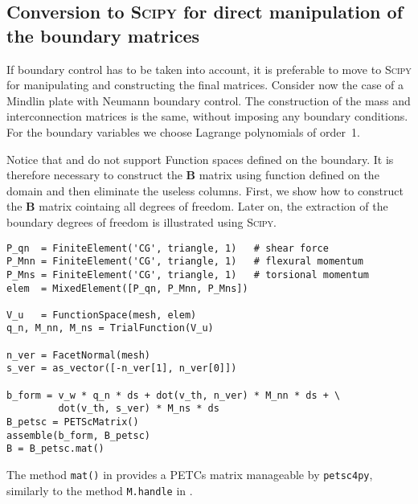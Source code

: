 \subsection*{Conversion to \textsc{Scipy} for direct manipulation of the boundary matrices}
If boundary control has to be taken into account, it is preferable to move to \textsc{Scipy} for manipulating and constructing the final matrices. Consider now the case of a Mindlin plate with Neumann boundary control. The construction of the mass and interconnection matrices is the same, without imposing any boundary conditions. For the boundary variables we choose Lagrange polynomials of order~1. 

\begin{remark}\label{rmk:Bmatrix}
Notice that \fenics and \firedrake do not support Function spaces defined on the boundary. It is therefore necessary to construct the $\mathbf{B}$ matrix using function defined on the domain and then eliminate the useless columns. First, we show how to construct the $\mathbf{B}$ matrix cointaing all degrees of freedom. Later on, the extraction of the boundary degrees of freedom is illustrated using \textsc{Scipy}. 
\end{remark}

\begin{tcolorbox}[title = Control matrix construction in  \fenics, coltitle=black, breakable, size=fbox, boxrule=1pt, pad at break*=1mm, colframe=red, enlarge top by=0.25em, enlarge bottom by=0.5em]
\begin{Verbatim}[tabsize=4]
P_qn  = FiniteElement('CG', triangle, 1)   # shear force
P_Mnn = FiniteElement('CG', triangle, 1)   # flexural momentum
P_Mns = FiniteElement('CG', triangle, 1)   # torsional momentum
elem  = MixedElement([P_qn, P_Mnn, P_Mns])
 
V_u   = FunctionSpace(mesh, elem)
q_n, M_nn, M_ns = TrialFunction(V_u)

n_ver = FacetNormal(mesh)  
s_ver = as_vector([-n_ver[1], n_ver[0]])

b_form = v_w * q_n * ds + dot(v_th, n_ver) * M_nn * ds + \
		 dot(v_th, s_ver) * M_ns * ds	 
B_petsc = PETScMatrix()
assemble(b_form, B_petsc)
B = B_petsc.mat()
\end{Verbatim}
\end{tcolorbox}	
The method \verb|mat()| in \fenics provides a PETCs matrix manageable by \verb|petsc4py|, similarly to the method \verb|M.handle| in \firedrake.

